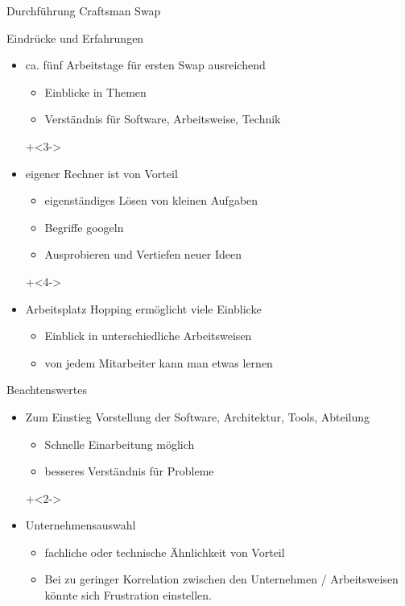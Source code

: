 \begin{frame}{Durchführung Craftsman Swap}

\end{frame}


\begin{frame}{Eindrücke und Erfahrungen}

\begin{itemize}
\onslide+<2->
\item ca. fünf Arbeitstage für ersten Swap ausreichend
\begin{itemize}
\item Einblicke in Themen
\item Verständnis für Software, Arbeitsweise, Technik
\end{itemize}

\onslide+<3->
\item eigener Rechner ist von Vorteil
\begin{itemize}
\item eigenständiges Lösen von kleinen Aufgaben
\item Begriffe googeln
\item Ausprobieren und Vertiefen neuer Ideen
\end{itemize}

\onslide+<4->
\item Arbeitsplatz Hopping ermöglicht viele Einblicke
\begin{itemize}
\item Einblick in unterschiedliche Arbeitsweisen
\item von jedem Mitarbeiter kann man etwas lernen
\end{itemize}

\end{itemize}

\end{frame}

\begin{frame}{Beachtenswertes}

\begin{itemize}

\item Zum Einstieg Vorstellung der Software, Architektur, Tools, Abteilung
\begin{itemize}
\item Schnelle Einarbeitung möglich
\item besseres Verständnis für Probleme
\end{itemize}

\onslide+<2->
\item Unternehmensauswahl
\begin{itemize}
\item fachliche oder technische Ähnlichkeit von Vorteil
\item Bei zu geringer Korrelation zwischen den Unternehmen / Arbeitsweisen könnte sich Frustration einstellen.
\end{itemize}

\end{itemize}

\end{frame}

